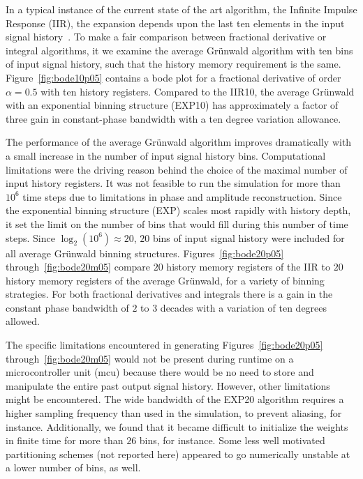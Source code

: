 In a typical instance of the current state of the art algorithm, the
Infinite Impulse Response (IIR), the expansion depends upon the
last ten elements in the input signal history~\cite{Chen:04a}. To make a
fair comparison between fractional derivative or integral algorithms,
it we examine the average Gr{\"u}nwald algorithm with ten bins of input
signal history, such that the history memory requirement is the
same. Figure~\ref{fig:bode10p05} contains a bode plot for a fractional
derivative of order $\alpha=0.5$ with ten history registers. Compared
to the IIR10, the average Gr{\"u}nwald with an exponential binning
structure (EXP10) has approximately a factor of three gain in
constant-phase bandwidth with a ten degree variation allowance. 

The performance of the average Gr{\"u}nwald algorithm improves
dramatically with a small increase in the number of input signal
history bins. Computational limitations were the driving reason behind the choice of the maximal number of input history registers. It was not feasible to run the simulation for more than $10^6$ time steps due to limitations in phase and amplitude reconstruction.  Since the exponential binning structure (EXP) scales most rapidly with history depth, it set the limit on the number of bins that would fill during this number of time steps. Since $\log_2(10^6)\approx 20$, $20$ bins of input signal history were included for all average Gr{\"u}nwald binning structures. Figures~\ref{fig:bode20p05} through~\ref{fig:bode20m05} compare $20$
history memory registers of the IIR to $20$ history memory
registers of the average Gr{\"u}nwald, for a variety of binning
strategies. For both fractional
derivatives and integrals there is a gain in the constant phase
bandwidth of $2$ to $3$ decades with a variation of ten degrees allowed.

The specific limitations encountered in generating Figures~\ref{fig:bode20p05} through~\ref{fig:bode20m05} would not be present during runtime on a microcontroller unit (mcu) because there would be no need to store and manipulate the entire past output signal history. However, other limitations might be encountered. The wide bandwidth of the EXP20 algorithm requires a higher sampling frequency than used in the simulation, to prevent aliasing, for instance. Additionally, we found that it became difficult to initialize the weights in finite time for more than $26$ bins, for instance. Some less well motivated partitioning schemes (not reported here) appeared to go numerically unstable at a lower number of bins, as well. 

